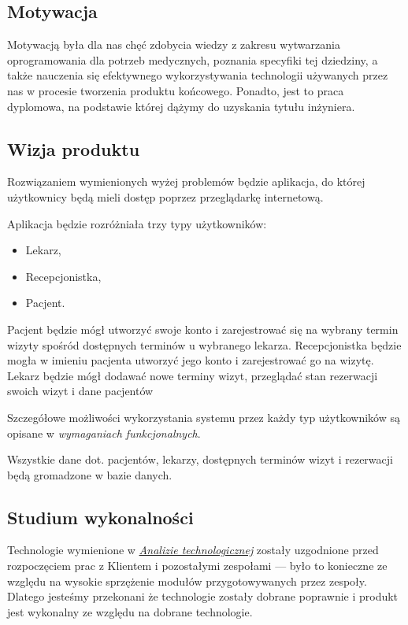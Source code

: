 \documentclass[polish,12pt]{aghthesis}
\begin{document}
\subsection{Motywacja}
Motywacją była dla nas chęć zdobycia wiedzy z zakresu wytwarzania oprogramowania dla potrzeb medycznych, poznania specyfiki tej dziedziny, a także nauczenia się efektywnego wykorzystywania technologii używanych przez nas w procesie tworzenia produktu końcowego. Ponadto, jest to praca dyplomowa, na podstawie której dążymy do uzyskania tytułu inżyniera.

\subsection{Wizja produktu}
Rozwiązaniem wymienionych wyżej problemów będzie aplikacja, do której użytkownicy będą mieli dostęp poprzez przeglądarkę internetową.

Aplikacja będzie rozróżniała trzy typy użytkowników:
\begin{itemize}
    \item Lekarz,
    \item Recepcjonistka,
    \item Pacjent.
\end{itemize}

Pacjent będzie mógł utworzyć swoje konto i zarejestrować się na wybrany termin wizyty spośród dostępnych terminów u wybranego lekarza. Recepcjonistka będzie mogła w imieniu pacjenta utworzyć jego konto i zarejestrować go na wizytę. Lekarz będzie mógł dodawać nowe terminy wizyt, przeglądać stan rezerwacji swoich wizyt i dane pacjentów

Szczegółowe możliwości wykorzystania systemu przez każdy typ użytkowników są opisane w \emph{wymaganiach funkcjonalnych}.

Wszystkie dane dot. pacjentów, lekarzy, dostępnych terminów wizyt i rezerwacji będą gromadzone w bazie danych.

\subsection{Studium wykonalności}
Technologie wymienione w \hyperref[subsec:analizaTechnologiczna]{\emph{Analizie technologicznej}} zostały uzgodnione przed rozpoczęciem prac z Klientem i pozostałymi zespołami --- było to konieczne ze względu na wysokie sprzężenie modułów przygotowywanych przez zespoły. Dlatego jesteśmy przekonani że technologie zostały dobrane poprawnie i produkt jest wykonalny ze względu na dobrane technologie.
\end{document}
